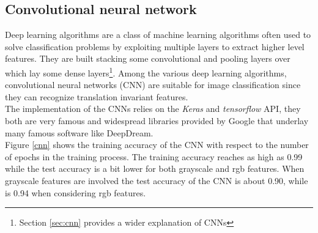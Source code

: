\documentclass{article}
\begin{document}
\subsection{Convolutional neural network}
Deep learning algorithms are a class of machine learning algorithms often used to solve classification problems by exploiting multiple layers to extract higher level features. They are built stacking some convolutional and pooling layers over which lay some dense layers\footnote{Section \ref{sec:cnn} provides a wider explanation of CNNs}. Among the various deep learning algorithms, convolutional neural networks (CNN) are suitable for image classification since they can recognize translation invariant features. \\
The implementation of the CNNs relies on the \textit{Keras} and \textit{tensorflow} API, they both are very famous and widespread libraries provided by Google that underlay many famous software like DeepDream.\\
Figure \ref{cnn} shows the training accuracy of the CNN with respect to the number of epochs in the training process. The training accuracy reaches as high as 0.99 while the test accuracy is a bit lower for both grayscale and rgb features.
When grayscale features are involved the test accuracy of the CNN is about 0.90, while is 0.94 when considering rgb features.
\end{document}
